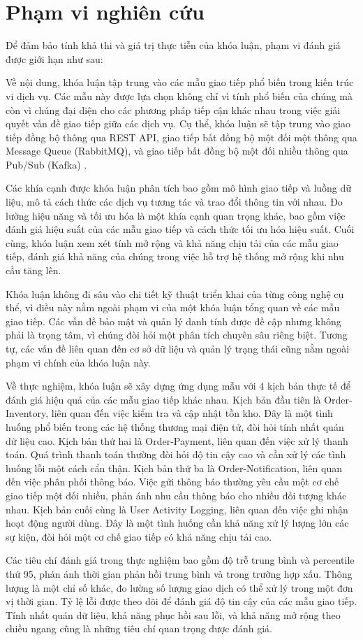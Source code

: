 \section{Phạm vi nghiên cứu}
Để đảm bảo tính khả thi và giá trị thực tiễn của khóa luận, phạm vi đánh giá được giới hạn như sau:

Về nội dung, khóa luận tập trung vào các mẫu giao tiếp phổ biến trong kiến trúc vi dịch vụ. Các mẫu này được lựa chọn không chỉ vì tính phổ biến của chúng mà còn vì chúng đại diện cho các phương pháp tiếp cận khác nhau trong việc giải quyết vấn đề giao tiếp giữa các dịch vụ. Cụ thể, khóa luận sẽ tập trung vào giao tiếp đồng bộ thông qua REST API, giao tiếp bất đồng bộ một đối một thông qua Message Queue (RabbitMQ), và giao tiếp bất đồng bộ một đối nhiều thông qua Pub/Sub (Kafka) \cite{aksakalli2021}.

Các khía cạnh được khóa luận phân tích bao gồm mô hình giao tiếp và luồng dữ liệu, mô tả cách thức các dịch vụ tương tác và trao đổi thông tin với nhau. Đo lường hiệu năng và tối ưu hóa là một khía cạnh quan trọng khác, bao gồm việc đánh giá hiệu suất của các mẫu giao tiếp và cách thức tối ưu hóa hiệu suất. Cuối cùng, khóa luận xem xét tính mở rộng và khả năng chịu tải của các mẫu giao tiếp, đánh giá khả năng của chúng trong việc hỗ trợ hệ thống mở rộng khi nhu cầu tăng lên.

Khóa luận không đi sâu vào chi tiết kỹ thuật triển khai của từng công nghệ cụ thể, vì điều này nằm ngoài phạm vi của một khóa luận tổng quan về các mẫu giao tiếp. Các vấn đề bảo mật và quản lý danh tính được đề cập nhưng không phải là trọng tâm, vì chúng đòi hỏi một phân tích chuyên sâu riêng biệt. Tương tự, các vấn đề liên quan đến cơ sở dữ liệu và quản lý trạng thái cũng nằm ngoài phạm vi chính của khóa luận này.

Về thực nghiệm, khóa luận sẽ xây dựng ứng dụng mẫu với 4 kịch bản thực tế để đánh giá hiệu quả của các mẫu giao tiếp khác nhau. Kịch bản đầu tiên là Order-Inventory, liên quan đến việc kiểm tra và cập nhật tồn kho. Đây là một tình huống phổ biến trong các hệ thống thương mại điện tử, đòi hỏi tính nhất quán dữ liệu cao. Kịch bản thứ hai là Order-Payment, liên quan đến việc xử lý thanh toán. Quá trình thanh toán thường đòi hỏi độ tin cậy cao và cần xử lý các tình huống lỗi một cách cẩn thận. Kịch bản thứ ba là Order-Notification, liên quan đến việc phân phối thông báo. Việc gửi thông báo thường yêu cầu một cơ chế giao tiếp một đối nhiều, phản ánh nhu cầu thông báo cho nhiều đối tượng khác nhau. Kịch bản cuối cùng là User Activity Logging, liên quan đến việc ghi nhận hoạt động người dùng. Đây là một tình huống cần khả năng xử lý lượng lớn các sự kiện, đòi hỏi một cơ chế giao tiếp có khả năng chịu tải cao.

Các tiêu chí đánh giá trong thực nghiệm bao gồm độ trễ trung bình và percentile thứ 95, phản ánh thời gian phản hồi trung bình và trong trường hợp xấu. Thông lượng là một chỉ số khác, đo lường số lượng giao dịch có thể xử lý trong một đơn vị thời gian. Tỷ lệ lỗi được theo dõi để đánh giá độ tin cậy của các mẫu giao tiếp. Tính nhất quán dữ liệu, khả năng phục hồi sau lỗi, và khả năng mở rộng theo chiều ngang cũng là những tiêu chí quan trọng được đánh giá. 